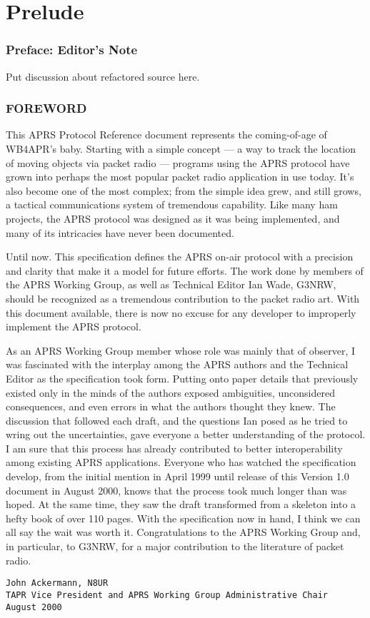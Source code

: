 
\part*{Prelude}

\section*{Preface: Editor's Note}
Put discussion about refactored source here.


\newpage

\section*{FOREWORD}

This APRS Protocol Reference document represents the coming-of-age of WB4APR’s baby.
Starting with a simple concept — a way to track the location of moving objects via packet radio
— programs using the APRS protocol have grown into perhaps the most popular packet radio
application in use today. It’s also become one of the most complex; from the simple idea grew,
and still grows, a tactical communications system of tremendous capability. Like many ham
projects, the APRS protocol was designed as it was being implemented, and many of its
intricacies have never been documented.

Until now. This specification defines the APRS on-air protocol with a precision and clarity that
make it a model for future efforts. The work done by members of the APRS Working Group, as
well as Technical Editor Ian Wade, G3NRW, should be recognized as a tremendous contribution
to the packet radio art. With this document available, there is now no excuse for any developer to
improperly implement the APRS protocol.

As an APRS Working Group member whose role was mainly that of observer, I was fascinated
with the interplay among the APRS authors and the Technical Editor as the specification took
form. Putting onto paper details that previously existed only in the minds of the authors exposed
ambiguities, unconsidered consequences, and even errors in what the authors thought they knew.
The discussion that followed each draft, and the questions Ian posed as he tried to wring out the
uncertainties, gave everyone a better understanding of the protocol. I am sure that this process has
already contributed to better interoperability among existing APRS applications.
Everyone who has watched the specification develop, from the initial mention in April 1999 until
release of this Version 1.0 document in August 2000, knows that the process took much longer
than was hoped. At the same time, they saw the draft transformed from a skeleton into a hefty
book of over 110 pages. With the specification now in hand, I think we can all say the wait was
worth it. Congratulations to the APRS Working Group and, in particular, to G3NRW, for a major
contribution to the literature of packet radio.

\begin{verbatim}
John Ackermann, N8UR
TAPR Vice President and APRS Working Group Administrative Chair
August 2000
\end{verbatim}


